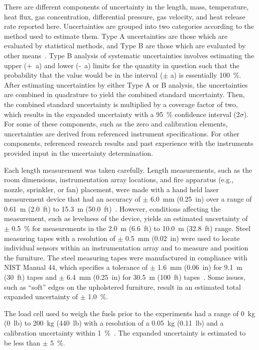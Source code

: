 \documentclass[12pt,oneside]{book}
\begin{document}
There are different components of uncertainty in the length, mass, temperature, heat flux, gas concentration, differential pressure, gas velocity, and heat release rate reported here. Uncertainties are grouped into two categories according to the method used to estimate them. Type A uncertainties are those which are evaluated by statistical methods, and Type B are those which are evaluated by other means~\cite{Taylor&Kuyatt:1994}. Type B analysis of systematic uncertainties involves estimating the upper (+~a) and lower (-~a) limits for the quantity in question such that the probability that the value would be in the interval ($\pm$ a) is essentially 100~\%. After estimating uncertainties by either Type A or B analysis, the uncertainties are combined in quadrature to yield the combined standard uncertainty. Then, the combined standard uncertainty is multiplied by a coverage factor of two, which results in the expanded uncertainty with a 95~\% confidence interval (2$\sigma$).  For some of these components, such as the zero and calibration elements, uncertainties are derived from referenced instrument specifications. For other components, referenced research results and past experience with the instruments provided input in the uncertainty determination.

Each length measurement was taken carefully. Length measurements, such as the room dimensions, instrumentation array locations, and fire apparatus (e.g., nozzle, sprinkler, or fan) placement, were made with a hand held laser measurement device that had an accuracy of $\pm$ 6.0~mm (0.25~in) over a range of 0.61~m (2.0~ft) to 15.3~m (50.0~ft)~\cite{StanleyTools}. However, conditions affecting the measurement, such as levelness of the device, yields an estimated uncertainty of $\pm$ 0.5~\% for measurements in the 2.0~m (6.6~ft) to 10.0~m (32.8~ft) range.  Steel measuring tapes with a resolution of  $\pm$ 0.5~mm (0.02~in) were used to locate individual sensors within an instrumentation array and to measure and position the furniture. The steel measuring tapes were manufactured in compliance with NIST Manual 44, which specifies a tolerance of $\pm$ 1.6~mm (0.06~in) for 9.1~m (30~ft) tapes and $\pm$ 6.4~mm (0.25~in) for 30.5~m (100~ft) tapes~\cite{Butcher:2012}. Some issues, such as ``soft'' edges on the upholstered furniture, result in an estimated total expanded uncertainty of $\pm$ 1.0~\%.

The load cell used to weigh the fuels prior to the experiments had a range of 0~kg (0~lb) to 200~kg (440~lb) with a resolution of a 0.05~kg (0.11~lb) and a calibration uncertainty within 1~\%~\cite{Ohaus:2000}. The expanded uncertainty is estimated to be less than $\pm$ 5~\%.
\end{document}
